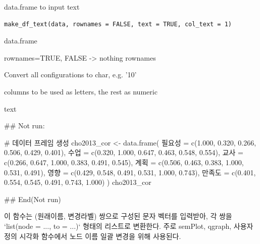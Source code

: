 \documentclass[a4paper]{book}
\begin{document}
%
\begin{Description}
data.frame to input text
\end{Description}
%
\begin{Usage}
\begin{verbatim}
make_df_text(data, rownames = FALSE, text = TRUE, col_text = 1)
\end{verbatim}
\end{Usage}
%
\begin{Arguments}
\begin{ldescription}
\item[\code{data}] data.frame

\item[\code{rownames}] rownames=TRUE, FALSE -> nothing rownames

\item[\code{text}] Convert all configurations to char, e.g. '10'

\item[\code{col\_text}] columns to be used as letters, the rest as numeric
\end{ldescription}
\end{Arguments}
%
\begin{Value}
text
\end{Value}
%
\begin{Examples}
\begin{ExampleCode}

## Not run: 

# 데이터 프레임 생성
cho2013_cor <- data.frame(
  필요성 = c(1.000, 0.320, 0.266, 0.506, 0.429, 0.401),
  수업 = c(0.320, 1.000, 0.647, 0.463, 0.548, 0.554),
  교사 = c(0.266, 0.647, 1.000, 0.383, 0.491, 0.545),
  계획 = c(0.506, 0.463, 0.383, 1.000, 0.531, 0.491),
  영향 = c(0.429, 0.548, 0.491, 0.531, 1.000, 0.743),
  만족도 = c(0.401, 0.554, 0.545, 0.491, 0.743, 1.000)
)
cho2013_cor %



## End(Not run)

\end{ExampleCode}
\end{Examples}
%
\begin{Description}
이 함수는 (원래이름, 변경라벨) 쌍으로 구성된 문자 벡터를 입력받아,
각 쌍을 `list(node = ..., to = ...)` 형태의 리스트로 변환한다.
주로 semPlot, qgraph, 사용자 정의 시각화 함수에서
노드 이름 일괄 변경을 위해 사용된다.
\end{Description}
\end{document}
